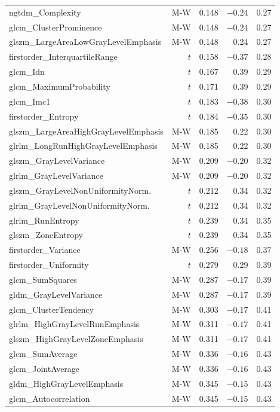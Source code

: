 \begin{appendices}
\begin{longtable}{p{6.5cm}rrrr}
ngtdm\_Complexity & M-W & 0.148 & $-0.24$ & 0.27 \\
glcm\_ClusterProminence & M-W & 0.148 & $-0.24$ & 0.27 \\
glszm\_LargeAreaLowGrayLevelEmphasis & M-W & 0.148 & 0.24 & 0.27 \\
firstorder\_InterquartileRange & $t$ & 0.158 & $-0.37$ & 0.28 \\
glcm\_Idn & $t$ & 0.167 & 0.39 & 0.29 \\
glcm\_MaximumProbability & $t$ & 0.171 & 0.39 & 0.29 \\
glcm\_Imc1 & $t$ & 0.183 & $-0.38$ & 0.30 \\
firstorder\_Entropy & $t$ & 0.184 & $-0.35$ & 0.30 \\
glszm\_LargeAreaHighGrayLevelEmphasis & M-W & 0.185 & 0.22 & 0.30 \\
glrlm\_LongRunHighGrayLevelEmphasis & M-W & 0.185 & 0.22 & 0.30 \\
glszm\_GrayLevelVariance & M-W & 0.209 & $-0.20$ & 0.32 \\
glrlm\_GrayLevelVariance & M-W & 0.209 & $-0.20$ & 0.32 \\
glszm\_GrayLevelNonUniformityNorm. & $t$ & 0.212 & 0.34 & 0.32 \\
glrlm\_GrayLevelNonUniformityNorm. & $t$ & 0.212 & 0.34 & 0.32 \\
glrlm\_RunEntropy & $t$ & 0.239 & 0.34 & 0.35 \\
glszm\_ZoneEntropy & $t$ & 0.239 & 0.34 & 0.35 \\
firstorder\_Variance & M-W & 0.256 & $-0.18$ & 0.37 \\
firstorder\_Uniformity & $t$ & 0.279 & 0.29 & 0.39 \\
glcm\_SumSquares & M-W & 0.287 & $-0.17$ & 0.39 \\
gldm\_GrayLevelVariance & M-W & 0.287 & $-0.17$ & 0.39 \\
glcm\_ClusterTendency & M-W & 0.303 & $-0.17$ & 0.41 \\
glrlm\_HighGrayLevelRunEmphasis & M-W & 0.311 & $-0.17$ & 0.41 \\
glszm\_HighGrayLevelZoneEmphasis & M-W & 0.311 & $-0.17$ & 0.41 \\
glcm\_SumAverage & M-W & 0.336 & $-0.16$ & 0.43 \\
glcm\_JointAverage & M-W & 0.336 & $-0.16$ & 0.43 \\
gldm\_HighGrayLevelEmphasis & M-W & 0.345 & $-0.15$ & 0.43 \\
glcm\_Autocorrelation & M-W & 0.345 & $-0.15$ & 0.43 \\

\end{longtable}
\end{appendices}
